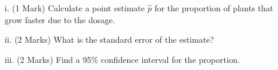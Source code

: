 \documentclass[a4paper,12pt]{article}
\begin{document}
\begin{itemize}
	\item[i.] (1 Mark) Calculate a point estimate $\hat{p}$ for the proportion of plants that grow faster due to the dosage. 									 
	\item[ii.] (2 Marks)  What is the standard error of the estimate? 			
	\item[iii.] (2 Marks) Find a 95\% confidence interval for the proportion. 					
\end{itemize}
\end{document}
